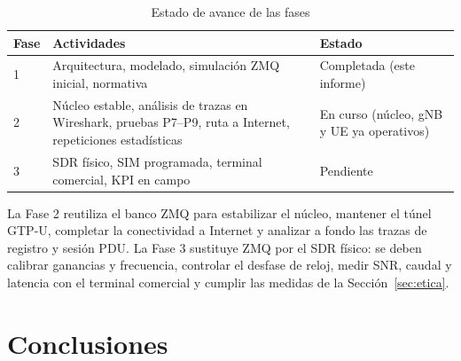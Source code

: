 \documentclass[conference]{IEEEtran}
\begin{document}
\begin{table}[!t]
\caption{Estado de avance de las fases}
\label{tab:cronograma}
\centering
\footnotesize
\renewcommand{\arraystretch}{1.15}
\begin{tabular}{p{1.4cm}p{4.0cm}p{2.3cm}}
\toprule
\textbf{Fase} & \textbf{Actividades} & \textbf{Estado} \\
\midrule
1 & Arquitectura, modelado, simulación ZMQ inicial, normativa & Completada (este informe) \\
2 & Núcleo estable, análisis de trazas en Wireshark, pruebas P7--P9, ruta a Internet, repeticiones estadísticas & En curso (núcleo, gNB y UE ya operativos) \\
3 & SDR físico, SIM programada, terminal comercial, KPI en campo & Pendiente \\
\bottomrule
\end{tabular}
\end{table}

La Fase 2 reutiliza el banco ZMQ para estabilizar el núcleo, mantener el túnel GTP-U, completar la conectividad a Internet y analizar a fondo las trazas de registro y sesión PDU. La Fase 3 sustituye ZMQ por el SDR físico: se deben calibrar ganancias y frecuencia, controlar el desfase de reloj, medir SNR, caudal y latencia con el terminal comercial y cumplir las medidas de la Sección~\ref{sec:etica}.

\section{Conclusiones}
\label{sec:concl}
\end{document}
